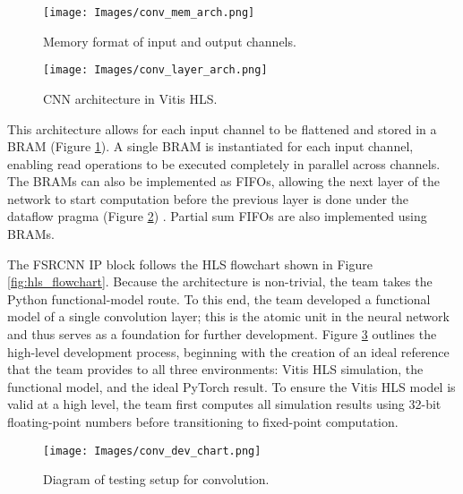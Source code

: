 \documentclass{article}
\newcounter{subsubsubsection}[subsubsection]
\begin{document}
            \begin{figure}[!tb] 
                \centering
                \texttt{[image: Images/conv\_mem\_arch.png]} 
                \caption{Memory format of input and output channels.} 
                \label{fig:flat_memory} 
            \end{figure}
            \begin{figure}[!tb] 
                \centering
                \texttt{[image: Images/conv\_layer\_arch.png]} 
                \caption{CNN architecture in Vitis HLS.} 
                \label{fig:layer_comms} 
            \end{figure}
            
            \par This architecture allows for each input channel to be flattened and stored in a BRAM (Figure \ref{fig:flat_memory}). A single BRAM is instantiated for each input channel, enabling read operations to be executed completely in parallel across channels. The BRAMs can also be implemented as FIFOs, allowing the next layer of the network to start computation before the previous layer is done under the dataflow pragma (Figure \ref{fig:layer_comms}) \cite{amd_vitis_nodate}. Partial sum FIFOs are also implemented using BRAMs.
            
            \noindent The FSRCNN IP block follows the HLS flowchart shown in Figure \ref{fig:hls_flowchart}. Because the architecture is non-trivial, the team takes the Python functional-model route. To this end, the team developed a functional model of a single convolution layer; this is the atomic unit in the neural network and thus serves as a foundation for further development. Figure \ref{fig:conv_dev} outlines the high-level development process, beginning with the creation of an ideal reference that the team provides to all three environments: Vitis HLS simulation, the functional model, and the ideal PyTorch result. To ensure the Vitis HLS model is valid at a high level, the team first computes all simulation results using 32-bit floating-point numbers before transitioning to fixed-point computation.
            \begin{figure}[!tb] 
                \centering
                \texttt{[image: Images/conv\_dev\_chart.png]} 
                \caption{Diagram of testing setup for convolution.} 
                \label{fig:conv_dev} 
            \end{figure}
\end{document}
